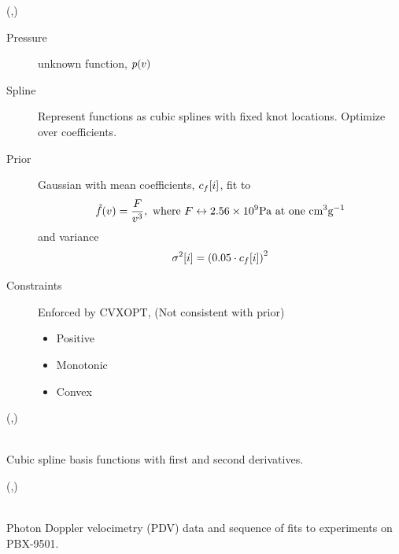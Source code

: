 \documentclass[a0]{a0poster}
\begin{document}
\begin{textblock}{3.7}(\colC,\EOSY)
  \begin{description}
  \item[Pressure] unknown function, $p(v)$
  \item[Spline] Represent functions as cubic splines with fixed knot
    locations.  Optimize over coefficients.
  \item[Prior] Gaussian with mean coefficients, $c_f[i]$, fit to
    \begin{equation*}
      \tilde f(v) = \frac{F}{v^3}, \text{ where } F \leftrightarrow
      2.56\times10^9 \text{Pa} \text{ at one cm}^{3}\text{g}^{-1}
    \end{equation*}
    and variance
    \begin{equation*}
      \sigma^2[i] = \left( 0.05 \cdot c_f[i] \right)^2
    \end{equation*}

  \item[Constraints] Enforced by CVXOPT, (Not consistent with prior)
    \begin{itemize}
    \item Positive
    \item Monotonic
    \item Convex
    \end{itemize}
  \end{description}
\end{textblock}
\begin{textblock}{4}(\colD,\EOSY)
  \begin{center}
     \\
    Cubic spline basis functions with first and second derivatives.
  \end{center}
\end{textblock}
\begin{textblock}{4}(\colE,\EOSY)
  \vspace{2cm}
  \begin{center}
  \\
  Photon Doppler velocimetry (PDV) data and sequence of fits to
  experiments on PBX-9501.
  \end{center}
\end{textblock}
\end{document}
